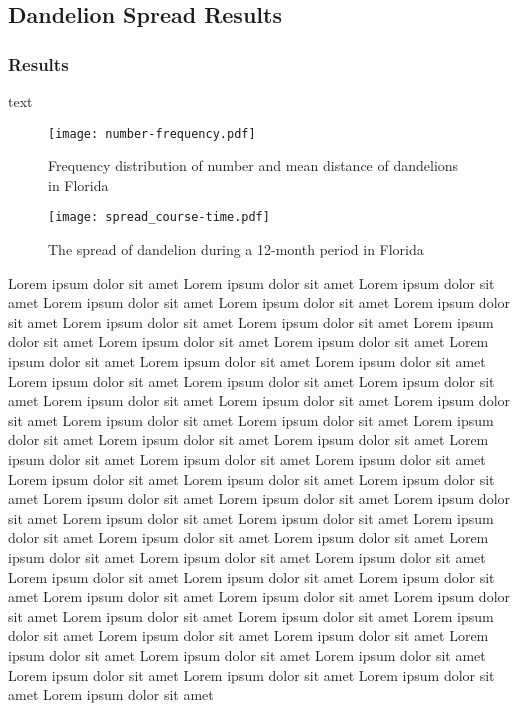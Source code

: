 \documentclass[12pt]{article}
\begin{document}
	\subsection{Dandelion Spread Results}
	
		\subsubsection{Results}
		
		text
		
		\begin{figure}
			\centering
			\texttt{[image: number-frequency.pdf]}
			\caption{Frequency distribution of number and mean distance of dandelions in Florida}
			\label{fig:freq}
		\end{figure}
		
		
		\begin{figure}
			\centering
			\texttt{[image: spread\_course-time.pdf]}
			\caption{The spread of dandelion during a 12-month period in Florida}
			\label{fig:spread}
		\end{figure}
		
		Lorem ipsum dolor sit amet Lorem ipsum dolor sit amet Lorem ipsum dolor sit amet Lorem ipsum dolor sit amet Lorem ipsum dolor sit amet Lorem ipsum dolor sit amet Lorem ipsum dolor sit amet Lorem ipsum dolor sit amet Lorem ipsum dolor sit amet Lorem ipsum dolor sit amet Lorem ipsum dolor sit amet Lorem ipsum dolor sit amet Lorem ipsum dolor sit amet Lorem ipsum dolor sit amet Lorem ipsum dolor sit amet Lorem ipsum dolor sit amet Lorem ipsum dolor sit amet Lorem ipsum dolor sit amet Lorem ipsum dolor sit amet Lorem ipsum dolor sit amet Lorem ipsum dolor sit amet Lorem ipsum dolor sit amet Lorem ipsum dolor sit amet Lorem ipsum dolor sit amet Lorem ipsum dolor sit amet Lorem ipsum dolor sit amet Lorem ipsum dolor sit amet Lorem ipsum dolor sit amet Lorem ipsum dolor sit amet Lorem ipsum dolor sit amet Lorem ipsum dolor sit amet Lorem ipsum dolor sit amet Lorem ipsum dolor sit amet Lorem ipsum dolor sit amet Lorem ipsum dolor sit amet Lorem ipsum dolor sit amet Lorem ipsum dolor sit amet Lorem ipsum dolor sit amet Lorem ipsum dolor sit amet Lorem ipsum dolor sit amet Lorem ipsum dolor sit amet Lorem ipsum dolor sit amet Lorem ipsum dolor sit amet Lorem ipsum dolor sit amet Lorem ipsum dolor sit amet Lorem ipsum dolor sit amet Lorem ipsum dolor sit amet Lorem ipsum dolor sit amet Lorem ipsum dolor sit amet Lorem ipsum dolor sit amet Lorem ipsum dolor sit amet Lorem ipsum dolor sit amet Lorem ipsum dolor sit amet Lorem ipsum dolor sit amet Lorem ipsum dolor sit amet Lorem ipsum dolor sit amet Lorem ipsum dolor sit amet Lorem ipsum dolor sit amet Lorem ipsum dolor sit amet Lorem ipsum dolor sit amet 
		
\end{document}
